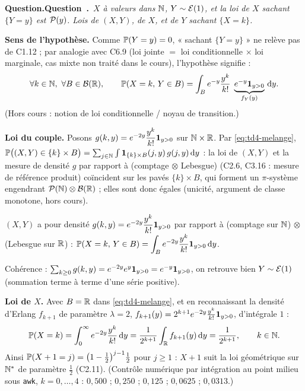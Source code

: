 \documentclass[11pt,a4paper]{article}
\newcommand{\question}[2]{\par\medskip\noindent\textbf{\ifx\relax#1\relax Question.\else Question~#1.\fi}~\textit{#2}\par\smallskip}
\begin{document}
\begin{exo}
\question{}{$X$ à valeurs dans $\mathbb{N}$, $Y\sim\mathcal{E}(1)$, et la loi de $X$ sachant $\{Y=y\}$ est $\mathcal{P}(y)$. Lois de $(X,Y)$, de $X$, et
de $Y$ sachant $\{X=k\}$.}

\textbf{Sens de l'hypothèse.} Comme $\mathbb{P}(Y=y)=0$, « sachant $\{Y=y\}$ » ne relève pas de C1.12 ; par analogie avec C6.9 (loi jointe
$=$ loi conditionnelle $\times$ loi marginale, cas mixte non traité dans le cours), l'hypothèse signifie :
\begin{equation}\label{eq:td4-melange}
\forall k\in\mathbb{N},\ \forall B\in\mathcal{B}(\mathbb{R}),\qquad \mathbb{P}(X=k,\,Y\in B)=\int_B e^{-y}\frac{y^k}{k!}\;\underbrace{e^{-y}\mathbf{1}_{y>0}}_{f_Y(y)}\,\mathrm{d} y .
\end{equation}
(Hors cours : notion de loi conditionnelle / noyau de transition.)

\textbf{Loi du couple.} Posons $g(k,y)=e^{-2y}\dfrac{y^k}{k!}\mathbf{1}_{y>0}$ sur $\mathbb{N}\times\mathbb{R}$. Par \eqref{eq:td4-melange},
$\mathbb{P}\bigl((X,Y)\in\{k\}\times B\bigr)=\sum_{j\in\mathbb{N}}\int\mathbf{1}_{\{k\}\times B}(j,y)\,g(j,y)\,\mathrm{d} y$ : la loi de $(X,Y)$ et la mesure de densité $g$
par rapport à (comptage $\otimes$ Lebesgue) (C2.6, C3.16 : mesure de référence produit) coïncident sur les pavés $\{k\}\times B$, qui forment un $\pi$-système
engendrant $\mathcal P(\mathbb{N})\otimes\mathcal{B}(\mathbb{R})$ ; elles sont donc égales (unicité, argument de classe monotone, hors cours).

\begin{resultat}
$(X,Y)$ a pour densité $g(k,y)=e^{-2y}\dfrac{y^k}{k!}\mathbf{1}_{y>0}$ par rapport à (comptage sur $\mathbb{N}$) $\otimes$ (Lebesgue sur $\mathbb{R}$) :
$\mathbb{P}(X=k,\,Y\in B)=\displaystyle\int_B e^{-2y}\frac{y^k}{k!}\mathbf{1}_{y>0}\,\mathrm{d} y$.
\end{resultat}

Cohérence : $\sum_{k\ge0}g(k,y)=e^{-2y}e^{y}\mathbf{1}_{y>0}=e^{-y}\mathbf{1}_{y>0}$, on retrouve bien $Y\sim\mathcal{E}(1)$ (sommation terme à terme d'une série positive).

\textbf{Loi de $X$.} Avec $B=\mathbb{R}$ dans \eqref{eq:td4-melange}, et en reconnaissant la densité d'Erlang $f_{k+1}$ de paramètre $\lambda=2$,
$f_{k+1}(y)=2^{k+1}e^{-2y}\frac{y^k}{k!}\mathbf{1}_{y>0}$, d'intégrale $1$ :
\[\mathbb{P}(X=k)=\int_0^{\infty}e^{-2y}\frac{y^k}{k!}\,\mathrm{d} y=\frac1{2^{k+1}}\int_{\mathbb{R}} f_{k+1}(y)\,\mathrm{d} y=\frac1{2^{k+1}},\qquad k\in\mathbb{N}.\]
Ainsi $\mathbb{P}(X+1=j)=\bigl(1-\tfrac12\bigr)^{j-1}\tfrac12$ pour $j\ge1$ : $X+1$ suit la loi géométrique sur $\mathbb{N}^*$ de paramètre $\frac12$ (C2.11).
(Contrôle numérique par intégration au point milieu sous \texttt{awk}, $k=0,\dots,4$ : $0{,}500$ ; $0{,}250$ ; $0{,}125$ ; $0{,}0625$ ; $0{,}0313$.)


\end{exo}
\end{document}
